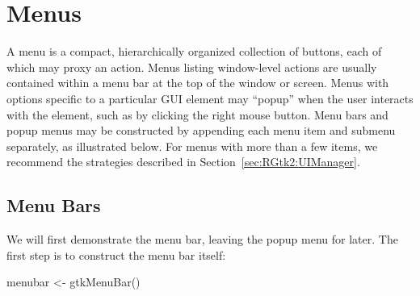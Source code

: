 \section{Menus}
\label{sec:RGtk2:menus}

A menu is a compact, hierarchically organized collection of buttons,
each of which may proxy an action. Menus listing window-level actions
are usually contained within a menu bar at the top of the window or
screen. Menus with options specific to a particular GUI element may
``popup'' when the user interacts with the element, such as by
clicking the right mouse button. Menu bars and popup menus may be
constructed by appending each menu item and submenu separately, as
illustrated below. For menus with more than a few items, we recommend
the strategies described in Section~\ref{sec:RGtk2:UIManager}.

\subsection{Menu Bars}

We will first demonstrate the menu bar, leaving the popup menu for
later.  The first step is to construct the menu bar itself:
\begin{Schunk}
\begin{Sinput}
 menubar <- gtkMenuBar()
\end{Sinput}
\end{Schunk}

